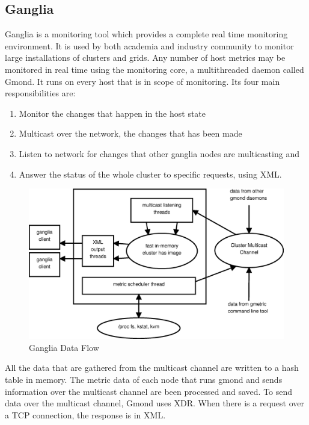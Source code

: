 \subsection{Ganglia}

Ganglia is a monitoring tool which provides a complete real time monitoring environment. It is used by both academia and industry community to monitor large installations of clusters and grids. Any number of host metrics may be monitored in real time using the monitoring core, a multithreaded daemon called Gmond. It runs on every host that is in scope of monitoring. Its four main responsibilities are:

\begin{enumerate}
\item Monitor the changes that happen in the host state
\item Multicast over the network, the changes that has been made
\item Listen to network for changes that other ganglia nodes are multicasting and
\item Answer the status of the whole cluster to specific requests, using XML.
\end{enumerate}

\begin{figure}[ht]
\centering
 \includegraphics[width=130mm]{images/ganglia.eps}
\caption{Ganglia Data Flow}
\label{figure:ganglia}
\end{figure}

All the data that are gathered from the multicast channel are written to a hash table in memory. The metric data of each node that runs gmond and sends information over the multicast channel are been processed and saved. To send data over the multicast channel, Gmond uses \ac{XDR}. When there is a request over a TCP connection, the response is in XML.

